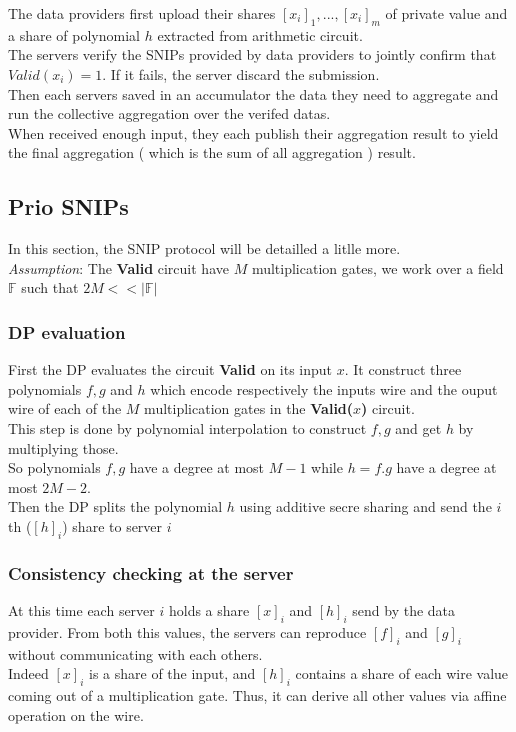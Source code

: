 \documentclass{article}
\begin{document}
The data providers first upload their shares $[x_i]_1,...,[x_i]_m$ of private value and a share of polynomial $h$ extracted from arithmetic circuit.\\
The servers verify the SNIPs provided by data providers to jointly confirm that $Valid(x_i) = 1$. If it fails, the server discard the submission.\\
Then each servers saved in an accumulator the data they need to aggregate and run the collective aggregation over the verifed datas.\\
When received enough input, they each publish their aggregation result to yield the final aggregation ( which is the sum of all aggregation ) result.

\subsection{Prio SNIPs}
In this section, the SNIP protocol will be detailled a litlle more.\\
\textit{Assumption}: The \textbf{Valid} circuit have $M$ multiplication gates, we work over a field $\mathbb{F}$ such that $ 2M << |\mathbb{F}| $\\
\subsubsection{DP evaluation}
First the DP evaluates the circuit \textbf{Valid} on its input $x$. It construct three polynomials $f,g $ and $h$ which encode respectively the inputs wire and the ouput wire of each of the $M$ multiplication gates in the \textbf{Valid($x$)} circuit.\\
This step is done by polynomial interpolation to construct $f,g$ and get $h$ by multiplying those.\\
So polynomials $f,g$ have a degree at most $M-1$ while $h = f . g$ have a degree at most $2M-2$.\\
Then the DP splits the polynomial $h$ using additive secre sharing and send the $i$th ($[h]_i$) share to server $i$
\subsubsection{Consistency checking at the server}
At this time each server $i$ holds a share $[x]_i$ and $[h]_i$ send by the data provider. From both this values, the servers can reproduce $[f]_i$ and $[g]_i$ without communicating with each others.\\
Indeed $[x]_i$ is a share of the input, and $[h]_i$ contains a share of each wire value coming out of a multiplication gate. Thus, it can derive all other values via affine operation on the wire.
\end{document}
